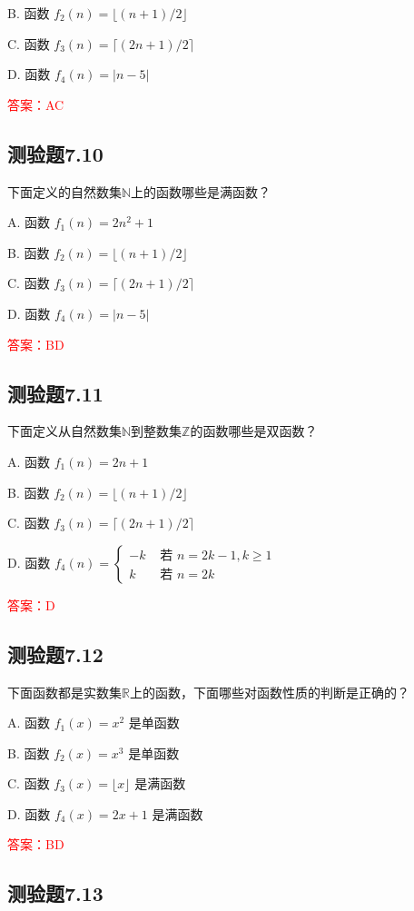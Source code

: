 \documentclass[UTF8, heading=true]{ctexart}
\begin{document}
B. 函数 $f_2(n)=\lfloor(n+1) / 2\rfloor$

C. 函数 $f_3(n)=\lceil(2 n+1) / 2\rceil$

D. 函数 $f_4(n)=|n-5|$

\textcolor{red}{答案：AC}

\subsection{测验题7.10}

下面定义的自然数集$\mathbb{N}$上的函数哪些是满函数？

A. 函数 $f_1(n)=2 n^2+1$

B. 函数 $f_2(n)=\lfloor(n+1) / 2\rfloor$

C. 函数 $f_3(n)=\lceil(2 n+1) / 2\rceil$

D. 函数 $f_4(n)=|n-5|$

\textcolor{red}{答案：BD}

\subsection{测验题7.11}

下面定义从自然数集$\mathbb{N}$到整数集$\mathbb{Z}$的函数哪些是双函数？

A. 函数 $f_1(n)=2 n+1$

B. 函数 $f_2(n)=\lfloor(n+1) / 2\rfloor$

C. 函数 $f_3(n)=\lceil(2 n+1) / 2\rceil$

D. 函数 $f_4(n)= \begin{cases}-k & \text { 若 } n=2 k-1, k \geq 1 \\ k & \text { 若 } n=2 k\end{cases}$

\textcolor{red}{答案：D}

\subsection{测验题7.12}

下面函数都是实数集$\mathbb{R}$上的函数，下面哪些对函数性质的判断是正确的？

A. 函数 $f_1(x)=x^2$ 是单函数

B. 函数 $f_2(x)=x^3$ 是单函数

C. 函数 $f_3(x)=\lfloor x\rfloor$ 是满函数

D. 函数 $f_4(x)=2 x+1$ 是满函数

\textcolor{red}{答案：BD}

\subsection{测验题7.13}
\end{document}
